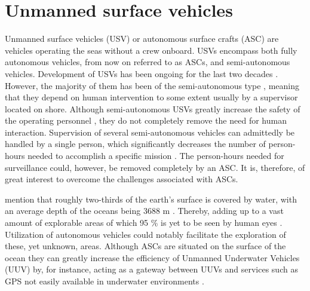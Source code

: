 \chapter{Unmanned surface vehicles} %

\label{Unmanned_Surface_Vehicles} %

Unmanned surface vehicles (USV) or autonomous surface crafts (ASC) are vehicles operating the seas without a crew onboard.
USVs encompass both fully autonomous vehicles, from now on referred to as ASCs, and semi-autonomous vehicles.
Development of USVs has been ongoing for the last two decades \cite{manley2008unmanned}.
However, the majority of them has been of the semi-autonomous type \cite{liu2016unmanned,park2017development}, meaning that they depend on human intervention to some extent usually by a supervisor located on shore.
Although semi-autonomous USVs greatly increase the safety of the operating personnel \cite{liu2016unmanned}, they do not completely remove the need for human interaction.
Supervision of several semi-autonomous vehicles can admittedly be handled by a single person, which significantly decreases the number of person-hours needed to accomplish a specific mission \cite{manley2008unmanned}.
The person-hours needed for surveillance could, however, be removed completely by an ASC.
It is, therefore, of great interest to overcome the challenges associated with ASCs.


\textcite{Yuh2011} mention that roughly two-thirds of the earth's surface is covered by water, with an average depth of the oceans being 3688 m \cite{depth_ocean}.
Thereby, adding up to a vast amount of explorable areas of which 95 \% is yet to be seen by human eyes \cite{explored_percentage}. Utilization of autonomous vehicles could notably facilitate the  exploration of these, yet unknown, areas.
Although ASCs are situated on the surface of the ocean they can greatly increase the efficiency of Unmanned Underwater Vehicles (UUV) by, for instance, acting as a gateway between UUVs and services such as GPS not easily available in underwater environments \cite{liu2016unmanned}.

